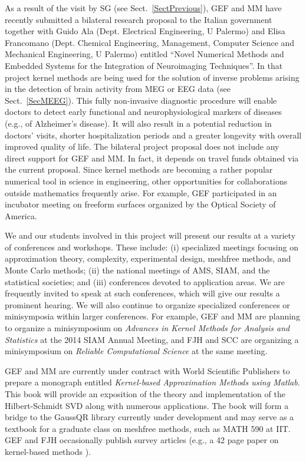 \documentclass[11pt]{NSFamsart}
\newcommand{\Matlab}{{\sc Matlab}\xspace}
\begin{document}
\begin{description}[leftmargin=2.5ex]
\item[Collaborating with Engineers]
As a result of the visit by SG (see Sect.~\ref{SectPrevious}), GEF and MM have recently submitted a bilateral research proposal to the Italian government together with Guido Ala (Dept. Electrical Engineering, U Palermo) and Elisa Francomano (Dept. Chemical Engineering, Management, Computer Science and Mechanical Engineering, U Palermo) entitled ``Novel Numerical Methods and Embedded Systems for the Integration of Neuroimaging Techniques''. In that project kernel methods are being used for the solution of inverse problems arising in the detection of brain activity from MEG or EEG data (see Sect.~\ref{SecMEEG}). This fully non-invasive diagnostic procedure will enable doctors to detect early functional and neurophysiological markers of diseases (e.g., of Alzheimer's disease). It will also result in a potential reduction in doctors' visits, shorter hospitalization periods and a greater longevity with overall improved quality of life. The bilateral project proposal does not include any direct support for GEF and MM. In fact, it depends on travel funds obtained via the current proposal. Since kernel methods are becoming a rather popular numerical tool in science in engineering, other opportunities for collaborations outside mathematics frequently arise. For example, GEF participated in an incubator meeting on freeform surfaces organized by the Optical Society of America.

\item[Organizing and Presenting at Conferences]
We and our students involved in this project will present our results at a variety of conferences and workshops.  These include: (i) specialized meetings focusing on approximation theory, complexity, experimental design, meshfree methods, and Monte Carlo methods; (ii) the national meetings of AMS, SIAM, and the statistical societies; and (iii) conferences devoted to application areas.  We are frequently invited to speak at such conferences, which will give our results a prominent hearing. We will also continue to organize specialized conferences or minisymposia within larger conferences. For example, GEF and MM are planning to organize a minisymposium on \emph{Advances in Kernel Methods for Analysis and Statistics} at the 2014 SIAM Annual Meeting, and FJH and SCC are organizing a minisymposium on \emph{Reliable Computational Science} at the same meeting.

\item[Writing Textbooks and Survey Papers]
GEF and MM are currently under contract with \linebreak[4] World Scientific Publishers to prepare a monograph entitled \emph{Kernel-based Approximation Methods using \Matlab}. This book will provide an exposition of the theory and implementation of the Hilbert-Schmidt SVD along with numerous applications. The book will form a bridge to the GaussQR library currently under development and may serve as a textbook for a graduate class on meshfree methods, such as MATH 590 at IIT. GEF and FJH occasionally publish survey articles (e.g., a 42 page paper on kernel-based methods \citep{Fasshauer11}).


\end{description}
\end{document}
